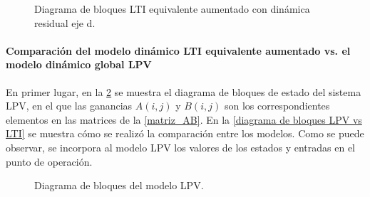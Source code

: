 \documentclass[a4paper, 10pt, onecolumn,journal]{ieeeconf}
\begin{document}
\begin{figure}[H]
	\centering
	\begin{adjustbox}{max width=\columnwidth}
	\end{adjustbox}
	\caption{Diagrama de bloques LTI equivalente aumentado con dinámica residual eje d.}
	\label{diagrama de bloques modelo LTI eq}
\end{figure}

\paragraph{\textbf{Comparación del modelo dinámico LTI equivalente aumentado vs. el modelo dinámico global LPV}}
En primer lugar, en la \cref{diagrama de bloques LPV} se muestra el diagrama de bloques de estado del sistema LPV, en el que las ganancias $A(i, j)$ y $B(i, j)$
son los correspondientes elementos en las matrices de la \cref{matriz_AB}.
En la \cref{diagrama de bloques LPV vs LTI} se muestra cómo se realizó la comparación entre los modelos. Como se puede observar,
se incorpora al modelo LPV los valores de los estados y entradas en el punto de operación.

\begin{figure}[H]
	\centering
	\begin{adjustbox}{max width=\columnwidth}
	\end{adjustbox}
	\caption{Diagrama de bloques del modelo LPV.}
	\label{diagrama de bloques LPV}
\end{figure}
\end{document}
